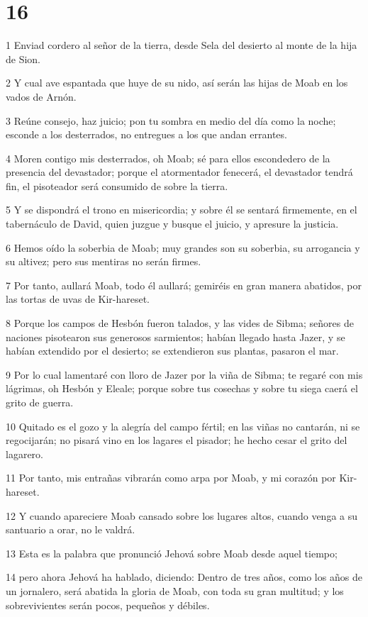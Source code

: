 \chapter{16}

\par 1 Enviad cordero al señor de la tierra, desde Sela del desierto al monte de la hija de Sion.
\par 2 Y cual ave espantada que huye de su nido, así serán las hijas de Moab en los vados de Arnón.
\par 3 Reúne consejo, haz juicio; pon tu sombra en medio del día como la noche; esconde a los desterrados, no entregues a los que andan errantes.
\par 4 Moren contigo mis desterrados, oh Moab; sé para ellos escondedero de la presencia del devastador; porque el atormentador fenecerá, el devastador tendrá fin, el pisoteador será consumido de sobre la tierra.
\par 5 Y se dispondrá el trono en misericordia; y sobre él se sentará firmemente, en el tabernáculo de David, quien juzgue y busque el juicio, y apresure la justicia.
\par 6 Hemos oído la soberbia de Moab; muy grandes son su soberbia, su arrogancia y su altivez; pero sus mentiras no serán firmes.
\par 7 Por tanto, aullará Moab, todo él aullará; gemiréis en gran manera abatidos, por las tortas de uvas de Kir-hareset.
\par 8 Porque los campos de Hesbón fueron talados, y las vides de Sibma; señores de naciones pisotearon sus generosos sarmientos; habían llegado hasta Jazer, y se habían extendido por el desierto; se extendieron sus plantas, pasaron el mar.
\par 9 Por lo cual lamentaré con lloro de Jazer por la viña de Sibma; te regaré con mis lágrimas, oh Hesbón y Eleale; porque sobre tus cosechas y sobre tu siega caerá el grito de guerra.
\par 10 Quitado es el gozo y la alegría del campo fértil; en las viñas no cantarán, ni se regocijarán; no pisará vino en los lagares el pisador; he hecho cesar el grito del lagarero.
\par 11 Por tanto, mis entrañas vibrarán como arpa por Moab, y mi corazón por Kir-hareset.
\par 12 Y cuando apareciere Moab cansado sobre los lugares altos, cuando venga a su santuario a orar, no le valdrá.
\par 13 Esta es la palabra que pronunció Jehová sobre Moab desde aquel tiempo;
\par 14 pero ahora Jehová ha hablado, diciendo: Dentro de tres años, como los años de un jornalero, será abatida la gloria de Moab, con toda su gran multitud; y los sobrevivientes serán pocos, pequeños y débiles. 

